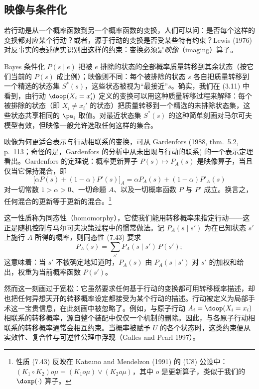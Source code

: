 \subsection{映像与条件化}

若行动是从一个概率函数到另一个概率函数的变换，人们可以问：是否每个这样的变换都对应某个行动？或者，源于行动的变换是否受某些特有约束？Lewis (1976) 对反事实的表述确实识别出这样的约束：变换必须是\emph{映像}（imaging）算子。

Bayes 条件化 $P(s\mid e)$ 把被 $e$ 排除的状态的全部概率质量转移到其余状态（按它们当前的 $P(s)$ 成比例）；映像则不同：每个被排除的状态 $s$ 各自把质量转移到一个精选的状态集 $S^*(s)$，这些状态被视为“最接近”$s$。确实，我们在 \textup{(3.11)} 中看到，由行动 $\doop(X_i=x_i')$ 定义的变换可以用这种质量转移过程来解释：每个被排除的状态（即 $X_i\ne x_i'$ 的状态）把质量转移到一个精选的未排除状态集，这些状态共享相同的 $\pa_i$ 取值。对最近状态集 $S^*(s)$ 的这种简单刻画对马尔可夫模型有效，但映像一般允许选取任何这样的集合。

映像为何更适合表示与行动相联系的变换，可从 Gardenfors (1988, thm.~5.2, p.~113；奇怪的是，Gardenfors 的分析中从未出现与行动的联系) 的一个表示定理看出。Gardenfors 的定理说：概率更新算子 $P(s)\mapsto P_A(s)$ 是映像算子，当且仅当它保持混合，即
\begin{equation}
\bigl[\alpha P(s)+(1-\alpha)P'(s)\bigr]_A=\alpha P_A(s)+(1-\alpha)P'_A(s) \tag{7.43}
\end{equation}
对一切常数 $1>\alpha>0$、一切命题 $A$、以及一切概率函数 $P$ 与 $P'$ 成立。换言之，任何混合的更新等于更新的混合。\footnote{性质 \textup{(7.43)} 反映在 Katsuno and Mendelzon (1991) 的 (U8) 公设中：$(K_1\circ K_2)o\mu=(K_1 o\mu)\vee(K_2 o\mu)$，其中 $o$ 是更新算子，类似于我们的 $\doxp(\cdot)$ 算子。}

这一性质称为同态性（homomorphy），它使我们能用转移概率来指定行动——这正是随机控制与马尔可夫决策过程中的惯常做法。记 $P_A(s\mid s')$ 为在已知状态 $s'$ 上施行 $A$ 所得的概率，则同态性 \textup{(7.43)} 要求
\begin{equation}
P_A(s)=\sum_{s'}P_A(s\mid s')\,P(s'); \tag{7.44}
\end{equation}
这意味着：当 $s'$ 不被确定地知道时，$P_A(s)$ 由 $P_A(s\mid s')$ 对 $s'$ 的加权和给出，权重为当前概率函数 $P(s')$。

然而这一刻画过于宽松：它虽然要求任何基于行动的变换都可用转移概率描述，却也把任何异想天开的转移概率设定都接受为某个行动的描述。行动被定义为局部手术这一宝贵信息，在此刻画中被忽略了。例如，与原子行动 $A_i=\doop(X_i=x_i)$ 相联系的转移概率，源自整个装配中仅仅一个机制的删除。因此，与各原子行动相联系的转移概率通常会相互约束。当概率被赋予 $U$ 的各个状态时，这类约束便从实效性、复合性与可逆性公理中浮现（Galles and Pearl 1997）。

